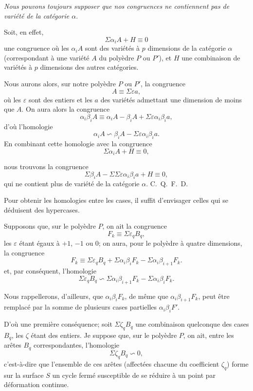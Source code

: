 \documentclass{article}
\begin{document}
\emph{Nous pouvons toujours supposer que nos congruences ne contiennent pas de variété de la catégorie $\alpha$}.

Soit, en effet,
\[ \Sigma \alpha_{i}A + H \equiv 0 \]
une congruence où les $\alpha_{i}A$ sont des variétés à $p$ dimensions de la catégorie $\alpha$ (correspondant à une variété $A$ du polyèdre $P$ ou $P'$), et $H$ une combinaison de variétés à $p$ dimensions des autres catégories.

Nous aurons alors, sur notre polyèdre $P$ ou $P'$, la congruence
\[ A \equiv \Sigma \varepsilon a, \]
où les $\varepsilon$ sont des entiers et les $a$ des variétés admettant une dimension de moins que $A$. On aura alors la congruence
\[ \alpha_{i}\beta_{i}A \equiv \alpha_{i}A - \beta_{i}A + \Sigma \varepsilon \alpha_{i}\beta_{i}a, \]
d'où l'homologie
\[ \alpha_{i}A \backsim \beta_{i}A - \Sigma \varepsilon \alpha_{i}\beta_{i}a. \]
En combinant cette homologie avec la congruence
\[ \Sigma \alpha_{i}A + H \equiv 0, \]

nous trouvons la congruence
\[ \Sigma \beta_{i}A - \Sigma \Sigma \varepsilon \alpha_{i}\beta_{i}a + H \equiv 0, \]
qui ne contient plus de variété de la catégorie $\alpha$. C.~Q.~F.~D.

Pour obtenir les homologies entre les cases, il suffit d'envisager celles qui se déduisent des hypercases.

Supposons que, sur le polyèdre $P$, on ait la congruence
\[ F_{k} \equiv \Sigma \varepsilon_{q} B_{q}, \]
les $\varepsilon$ étant égaux à $+1$, $-1$ ou 0; on aura, pour le polyèdre à quatre dimensions, la congruence
\[ F_{k} \equiv \Sigma \varepsilon_{q} B_{q} + \Sigma \alpha_{i}\beta_{i}F_{k} - \Sigma \alpha_{i}\beta_{i+1}F_{k}. \]
et, par conséquent, l'homologie
\[ \Sigma \varepsilon_{q} B_{q} \backsim \Sigma \alpha_{i}\beta_{i+1}F_{k} - \Sigma \alpha_{i}\beta_{i}F_{k}. \tag{1} \]

Nous rappellerons, d'ailleurs, que $\alpha_{i}\beta_{i}F_{k}$, de même que $\alpha_{i}\beta_{i+1}F_{k}$, peut être remplacé par la somme de plusieurs cases partielles $\alpha_{i}\beta_{i}F'$.

D'où une première conséquence; soit $\Sigma \zeta_{q} B_{q}$ une combinaison quelconque des cases $B_{q}$, les $\zeta$ étant des entiers. Je suppose que, sur le polyèdre $P$, on ait, entre les arêtes $B_{q}$ correspondantes, l'homologie
\[ \Sigma \zeta_{q} B_{q} \backsim 0, \]
c'est-à-dire que l'ensemble de ces arêtes (affectées chacune du coefficient $\zeta_{q}$) forme sur la surface $S$ un cycle fermé susceptible de se réduire à un point par déformation continue.
\end{document}
